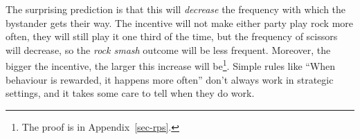 \documentclass[
  12pt,
  letterpaper,
  DIV=11,
  numbers=noendperiod]{scrreprt}
\begin{document}
\begin{table}

\caption{\label{tbl-rps}Two versions of Rock-Paper-Scissors}

\begin{minipage}[t]{0.50\linewidth}



\end{minipage}%
%
\begin{minipage}[t]{0.50\linewidth}



\end{minipage}%

\end{table}%

The surprising prediction is that this will \emph{decrease} the
frequency with which the bystander gets their way. The incentive will
not make either party play rock more often, they will still play it one
third of the time, but the frequency of scissors will decrease, so the
\emph{rock smash} outcome will be less frequent. Moreover, the bigger
the incentive, the larger this increase will be\footnote{The proof is in
  Appendix~\ref{sec-rps}.}. Simple rules like ``When behaviour is
rewarded, it happens more often'' don't always work in strategic
settings, and it takes some care to tell when they do work.
\end{document}
